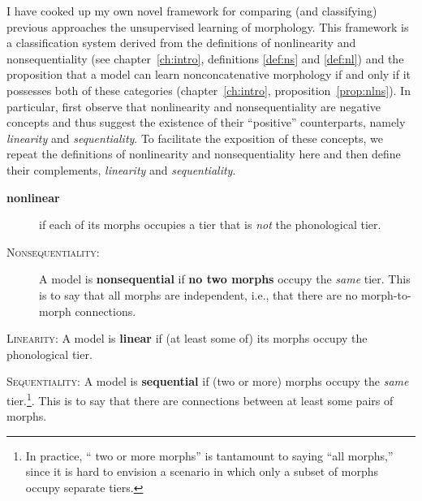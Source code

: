 I have cooked up my own novel framework for comparing (and classifying)
previous approaches
the unsupervised learning of morphology. This framework is a classification 
system derived from the definitions of nonlinearity and nonsequentiality 
(see chapter~\ref{ch:intro}, definitions \ref{def:ns} and \ref{def:nl}) 
and the proposition that 
a model can learn nonconcatenative morphology if and only if it 
possesses both of these categories (chapter~\ref{ch:intro}, 
proposition~\ref{prop:nlns}). In particular, first observe that nonlinearity 
and nonsequentiality are negative concepts and thus suggest the existence 
of their ``positive'' counterparts, namely \emph{linearity} and 
\emph{sequentiality}. To facilitate the exposition of these concepts, we 
repeat the definitions of nonlinearity and nonsequentiality here and 
then define their complements, \emph{linearity} and \emph{sequentiality}.
	\begin{description}%
	\item[\textbf{nonlinear}] if each of its morphs occupies a tier that is \emph{not} the phonological tier.
	\item[{\textsc{Nonsequentiality}}:]
	A model is \textbf{nonsequential} if \textbf{no two morphs} occupy the \emph{same} tier. This is to say that all morphs are independent, i.e., that there are no morph-to-morph connections. 
	\end{description}
	\begin{definition}\label{def:l}{\textsc{Linearity}}:
	A model is \textbf{linear} if (at least some of) its morphs occupy the phonological tier.
	\end{definition}
	\begin{definition}\label{def:s}{\textsc{Sequentiality}}:
A model is \textbf{sequential} if (two or more) morphs occupy the \emph{same} tier.\footnote{In practice, `` two or more morphs'' is tantamount to saying ``all morphs,'' since it is hard to envision a scenario in which only a subset of morphs occupy separate tiers.}. This is to say that there are connections between at least some pairs of morphs.
	\end{definition}

